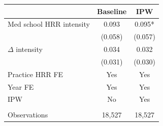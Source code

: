 
\begin{tabular}{lcc}
\toprule
 & Baseline & IPW\\
\midrule
Med school HRR intensity & 0.093 & 0.095*\\
 & (0.058) & (0.057)\\
$\Delta$ intensity & 0.034 & 0.032\\
 & (0.031) & (0.030)\\
\addlinespace
Practice HRR FE & Yes & Yes\\
Year FE & Yes & Yes\\
IPW & No & Yes\\
\midrule\\
Observations & 18,527 & 18,527\\
\bottomrule
\end{tabular}
